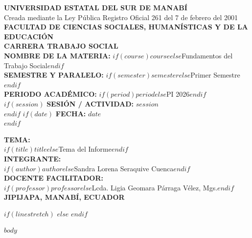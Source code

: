 \documentclass[$if(fontsize)$$fontsize$$else$12pt$endif$,spanish]{$if(documentclass)$$documentclass$$else$article$endif$}
\begin{document}
\begin{center}
    \vspace*{1.5cm}
    \normalsize\textbf{UNIVERSIDAD ESTATAL DEL SUR DE MANABÍ} \\[0.2cm]
    \normalsize Creada mediante la Ley Pública Registro Oficial 261 del 7 de febrero del 2001 \\[0.4cm]
    \normalsize\textbf{FACULTAD DE CIENCIAS SOCIALES, HUMANÍSTICAS Y DE LA EDUCACIÓN} \\[0.3cm]
    \textbf{CARRERA TRABAJO SOCIAL} \\[1.2cm]
    
    \textbf{NOMBRE DE LA MATERIA:} $if(course)$$course$$else$Fundamentos del Trabajo Social$endif$ \\[0.3cm]
    \textbf{SEMESTRE Y PARALELO:} $if(semester)$$semester$$else$Primer Semestre$endif$ \\[0.3cm]
    \textbf{PERIODO ACADÉMICO:} $if(period)$$period$$else$PI 2026$endif$ \\[0.3cm]
$if(session)$
    \textbf{SESIÓN / ACTIVIDAD:} $session$ \\[0.3cm]
$endif$
$if(date)$
    \textbf{FECHA:} $date$ \\[0.3cm]
$endif$
    \vspace{0.6cm}
    
    \textbf{TEMA:} \\[0.2cm]
    $if(title)$$title$$else$Tema del Informe$endif$ \\[1.2cm]
    
    \textbf{INTEGRANTE:} \\[0.2cm]
    $if(author)$$author$$else$Sandra Lorena Seraquive Cuenca$endif$ \\[1.2cm]
    
    \textbf{DOCENTE FACILITADOR:} \\[0.2cm]
    $if(professor)$$professor$$else$Lcda. Ligia Geomara Párraga Vélez, Mgs.$endif$ \\[1.5cm]
    
    \textbf{JIPIJAPA, MANABÍ, ECUADOR}
\end{center}

\thispagestyle{empty}
\newpage
{}
$if(linestretch)$
$else$
\doublespacing
$endif$
\setlength{\parindent}{1.27cm}

$body$
\end{document}
